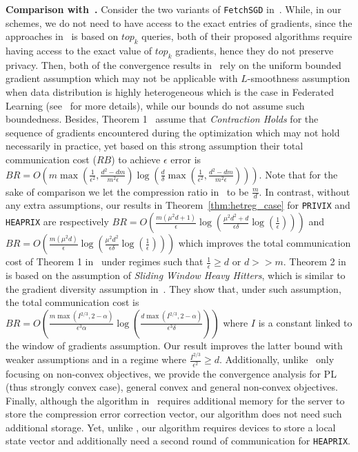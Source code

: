 \documentclass[twoside]{article}
\begin{document}
\vspace{0.05in}\noindent\textbf{Comparison with~\cite{rothchild2020fetchsgd}.}
Consider the two variants of \texttt{FetchSGD} in~\cite{rothchild2020fetchsgd}. 
While, in our schemes, we do not need to have access to the exact entries of gradients, since the approaches in~\cite{rothchild2020fetchsgd} is based on $top_k$ queries, both of their proposed algorithms require having access to the exact value of $top_k$ gradients, hence they do not preserve privacy. 
Then, both of the convergence results in~\cite{rothchild2020fetchsgd} rely on the uniform bounded gradient assumption which may not be applicable with $L$-smoothness assumption when data distribution is highly heterogeneous which is the case in Federated Learning (see~\cite{bayoumi2020tighter} for more details), while our bounds do not assume such boundedness.
Besides, Theorem 1~\cite{rothchild2020fetchsgd} assume that \emph{Contraction Holds} for the sequence of gradients encountered during the optimization which may not hold necessarily in practice, yet based on this strong assumption their total communication cost ($RB$) to achieve $\epsilon$ error is  $BR=O\left(m\max(\frac{1}{\epsilon^2},\frac{d^2-dm}{m^2\epsilon})\log\left(\frac{d}{\delta}\max(\frac{1}{\epsilon^2},\frac{d^2-dm}{m^2\epsilon})\right)\right)$.
Note that for the sake of comparison we let the compression ratio in~\cite{rothchild2020fetchsgd} to be $\frac{m}{d}$. 
In contrast, without any extra assumptions, our results in Theorem~\ref{thm:hetreg_case} for \texttt{PRIVIX} and \texttt{HEAPRIX} are respectively $BR=O\left(\frac{m\left(\mu^2d+1\right)}{\epsilon}\log\left(\frac{\mu^2d^2+d}{\epsilon\delta}\log\left(\frac{1}{\epsilon}\right)\right)\right)$ and $BR=O\left(\frac{m\left(\mu^2d\right)}{\epsilon}\log\left(\frac{\mu^2d^2}{\epsilon\delta}\log\left(\frac{1}{\epsilon}\right)\right)\right)$ which improves the total communication cost of Theorem 1 in~\cite{rothchild2020fetchsgd} under regimes such that $\frac{1}{\epsilon}\geq d$ or $d>>m$. 
Theorem 2 in~\cite{rothchild2020fetchsgd} is based on the assumption of \emph{Sliding Window Heavy Hitters}, which is similar to the gradient diversity assumption in~\cite{li2018federated,haddadpour2019convergence}. 
They show that, under such assumption, the total communication cost is $BR=O\left(\frac{m\max(I^{2/3},2-\alpha)}{\epsilon^3\alpha}\log\left(\frac{d\max(I^{2/3},2-\alpha)}{\epsilon^3\delta}\right)\right)$ where $I$ is a constant linked to the window of gradients assumption.
Our result improves the latter bound with weaker assumptions and in a regime where $\frac{I^{2/3}}{\epsilon^2}\geq d$. 
Additionally, unlike~\cite{rothchild2020fetchsgd} only focusing on non-convex objectives, we provide the convergence analysis for PL (thus strongly convex case), general convex and general non-convex objectives. 
Finally, although the algorithm in~\cite{rothchild2020fetchsgd} requires additional memory for the server to store the compression error correction vector, our algorithm does not need such additional storage. 
Yet, unlike \cite{rothchild2020fetchsgd}, our algorithm requires devices to store a local state vector and additionally need a second round of communication for \texttt{HEAPRIX}.
\end{document}
